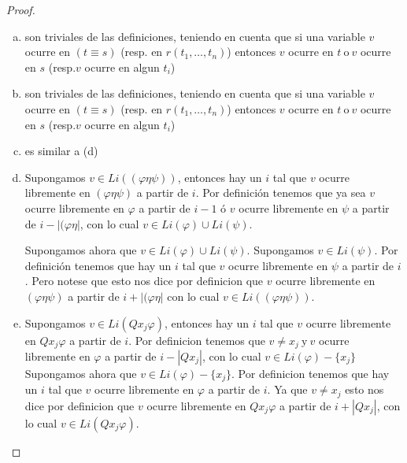   \begin{proof}
    \PN \newline
    \begin{enumerate}[(a)]
      \item son triviales de las definiciones, teniendo en cuenta que si una variable $v$ ocurre en $(t\equiv s)$ (resp. en $r(t_{1}, \dotsc, t_{n})$) entonces $v$ ocurre en $t \ \text{o} \ v$ ocurre en $s$ (resp.$v$ ocurre en algun $ t_{i}$)
      \item son triviales de las definiciones, teniendo en cuenta que si una variable $v$ ocurre en $(t\equiv s)$ (resp. en $r(t_{1}, \dotsc, t_{n})$) entonces $v$ ocurre en $t \ \text{o} \ v$ ocurre en $s$ (resp.$v$ ocurre en algun $ t_{i}$)
      \item es similar a (d)
      \item Supongamos $v \in Li((\varphi \eta \psi))$, entonces hay un $i$ tal que $ v$ ocurre libremente en $(\varphi
        \eta \psi )$ a partir de $i$. Por definición tenemos que ya sea $v$ ocurre libremente en $\varphi$ a partir de
        $i-1$ ó $v$ ocurre libremente en $\psi$ a partir de $i-\left\vert (\varphi \eta \right\vert$, con lo cual $v \in
        Li(\varphi) \cup Li(\psi)$.

        \PN Supongamos ahora que $v \in Li(\varphi) \cup Li(\psi)$. Supongamos $v \in Li(\psi)$. Por definición tenemos
        que hay un $i$ tal que $v$ ocurre libremente en $\psi$ a partir de $i$. Pero notese que esto nos dice por definicion que $v$ ocurre libremente en $(\varphi \eta \psi )$ a partir de $ i+\left\vert (\varphi \eta \right\vert $ con lo cual $v\in Li((\varphi \eta \psi ))$.
      \item Supongamos $v\in Li(Qx_{j}\varphi )$, entonces hay un $i$ tal que $v$ ocurre libremente en $Qx_{j}\varphi $ a partir de $i$. Por definicion tenemos que $v\neq x_{j} \ \text{y} \ v$ ocurre libremente en $\varphi $ a partir de $ i-\left\vert Qx_{j}\right\vert $, con lo cual $v\in Li(\varphi )-\{x_{j}\}$
      Supongamos ahora que $v\in Li(\varphi )-\{x_{j}\}$. Por definicion tenemos que hay un $i$ tal que $v$ ocurre libremente en $\varphi $ a partir de $i$. Ya que $v\neq x_{j}$ esto nos dice por definicion que $v$ ocurre libremente en $Qx_{j}\varphi $ a partir de $i+\left\vert Qx_{j}\right\vert $, con lo cual $v\in Li(Qx_{j}\varphi )$.
    \end{enumerate}
  \end{proof}

